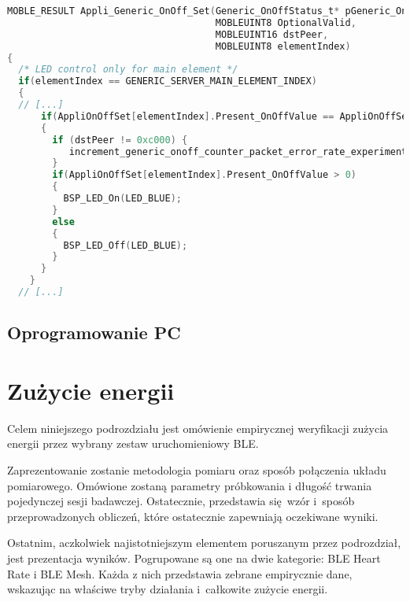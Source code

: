 \begin{lstlisting}[language=C,
    caption={Testowy kod C},
    label={lst:kod cpp}]
MOBLE_RESULT Appli_Generic_OnOff_Set(Generic_OnOffStatus_t* pGeneric_OnOffParam, 
                                     MOBLEUINT8 OptionalValid,
                                     MOBLEUINT16 dstPeer,
                                     MOBLEUINT8 elementIndex)
{
  /* LED control only for main element */
  if(elementIndex == GENERIC_SERVER_MAIN_ELEMENT_INDEX)
  {
  // [...]
      if(AppliOnOffSet[elementIndex].Present_OnOffValue == AppliOnOffSet[elementIndex].TargetValue)
      {
    	if (dstPeer != 0xc000) {
    	   increment_generic_onoff_counter_packet_error_rate_experiment(AppliOnOffSet[elementIndex].Present_OnOffValue, dstPeer);
    	}
        if(AppliOnOffSet[elementIndex].Present_OnOffValue > 0)
        {
          BSP_LED_On(LED_BLUE);
        }
        else
        {
          BSP_LED_Off(LED_BLUE);
        }
      }
    }  
  // [...]
\end{lstlisting}

\subsection{Oprogramowanie PC} \label{prep:pc-software}


\section{Zużycie energii}
Celem niniejszego podrozdziału jest omówienie empirycznej weryfikacji
zużycia energii przez wybrany zestaw uruchomieniowy \gls{BLE}.

Zaprezentowanie zostanie metodologia pomiaru oraz sposób połączenia
układu pomiarowego. Omówione zostaną parametry próbkowania i długość trwania
pojedynczej sesji badawczej. Ostatecznie, przedstawia się wzór i~sposób
przeprowadzonych obliczeń, które ostatecznie zapewniają oczekiwane wyniki.

Ostatnim, aczkolwiek najistotniejszym elementem poruszanym przez podrozdział,
jest prezentacja wyników. Pogrupowane są one na dwie kategorie: BLE Heart Rate
i BLE Mesh. Każda z nich przedstawia zebrane empirycznie dane, wskazując
na właściwe tryby działania i~całkowite zużycie energii.

